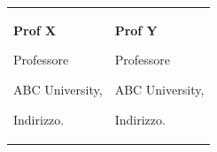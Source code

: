 

\begin{tabularx}{\textwidth}{@{}X X@{}}
\textbf{Prof X}\par
Professore\par
ABC University,\par 
Indirizzo.\par 
\makefield{\faEnvelopeO}{\url{abc@def.edu}}
& 
\textbf{Prof Y}\par
Professore\par
ABC University,\par 
Indirizzo.\par 
\makefield{\faEnvelopeO}{\url{abc@def.edu}}
\\
\end{tabularx}
